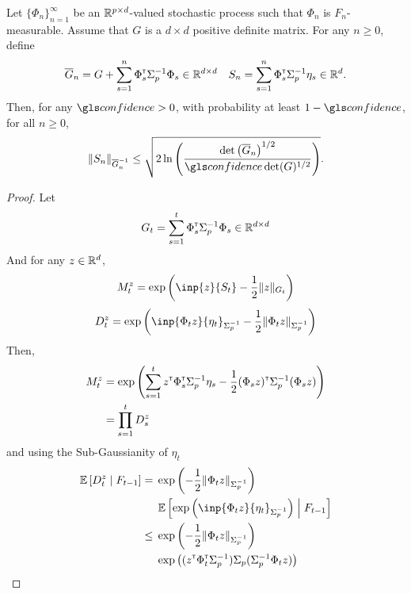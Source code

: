 \begin{subappendices}
\begin{proposition}
\begin{leftbar}[propositionbar]
		Let $\{\Phi_n\}_{n=1}^\infty$ be an $\mathbb{R}^{p\times d}$-valued stochastic process such that $\Phi_n$ is $F_n$-measurable. Assume that $G$ is a $d\times d$ positive definite matrix. For any $n\geq 0$, define
		\begin{equation*}
		\overline{G}_n = G + \sum_{s=1}^n \Phi_s^{\mathsf{\scriptscriptstyle T}} \Sigma_p^{-1} \Phi_s \in \mathbb{R}^{d\times d} \quad S_n = \sum_{s=1}^n \Phi_s^{\mathsf{\scriptscriptstyle T}}\Sigma_p^{-1}\eta_s \in \mathbb{R}^{d}.
		\end{equation*}
		Then, for any $\confidence>0$, with probability at least $1-\confidence$, for all $n\geq0$,
		\begin{align*}
		\| S_n \|_{\overline{G}_n^{-1}} \leq \sqrt{2\ln \left(\frac{\det\left(\overline{G}_n\right)^{1/2}}{\confidence\det(G)^{1/2}}\right)}.
		\end{align*}
		\end{leftbar}
	\end{proposition}
	\begin{proof}
		Let 
		\begin{equation*}
		G_t = \sum_{s=1}^t \Phi_s^{\mathsf{\scriptscriptstyle T}} \Sigma_p^{-1} \Phi_s \in \mathbb{R}^{d\times d}
		\end{equation*}
		And for any $z\in\mathbb{R}^d$,
		\begin{equation*}
		M_t^z = \exp{\left(\inp{z}{S_t} - \frac{1}{2}\|z\|_{G_t}\right)}
		\end{equation*}
		\begin{equation*}
		D_t^z = \exp{\left(\inp{\Phi_t z}{\eta_t}_{\Sigma_p^{-1}} - \frac{1}{2}\|\Phi_t z\|_{\Sigma_p^{-1}}\right)}
		\end{equation*}
		Then,
		\begin{align*}
		M_t^z &= \exp{\left(\sum_{s=1}^t z^{\mathsf{\scriptscriptstyle T}}\Phi_s^{\mathsf{\scriptscriptstyle T}}\Sigma_p^{-1} \eta_s - \frac{1}{2} (\Phi_s z)^{\mathsf{\scriptscriptstyle T}}\Sigma_p^{-1}(\Phi_s z) \right)} \\
		&= \prod_{s=1}^{t} D_s^z
		\end{align*}
		and using the Sub-Gaussianity of $\eta_t$
		\begin{align*}
		\expectedvalue\left[D_t^z \condbar F_{t-1}\right] = {}& \exp{\left(- \frac{1}{2}\|\Phi_t z\|_{\Sigma_p^{-1}}\right)}\\ &\expectedvalue\left[\exp{\left(\inp{\Phi_t z}{\eta_t}_{\Sigma_p^{-1}}\right)} \condbar F_{t-1}\right]  \\
		\leq {} & \exp{\left(- \frac{1}{2}\|\Phi_t z\|_{\Sigma_p^{-1}}\right)}\\
		&\exp{\left((z^\transp \Phi_t^\transp \Sigma_p^{-1})\Sigma_p(\Sigma_p^{-1} \Phi_t z)\right)}\\

\end{align*}
\end{proof}
\end{subappendices}
